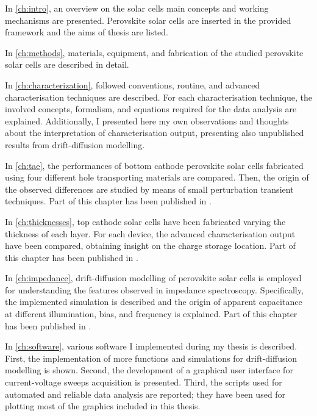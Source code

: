 
\hspace{\parindent}In \cref{ch:intro}, an overview on the solar cells main concepts and working mechanisms are presented.
Perovskite solar cells are inserted in the provided framework and the aims of thesis are listed.

In \cref{ch:methods}, materials, equipment, and fabrication of the studied perovskite solar cells are described in detail.

In \cref{ch:characterization}, followed conventions, routine, and advanced characterisation techniques are described.
For each characterisation technique, the involved concepts, formalism, and equations required for the data analysis are explained.
Additionally, I presented here my own observations and thoughts about the interpretation of characterisation output, presenting also unpublished results from drift\hyp{}diffusion modelling.

In \cref{ch:tae}, the performances of bottom cathode perovskite solar cells fabricated using four different hole transporting materials are compared.
Then, the origin of the observed differences are studied by means of small perturbation transient techniques.
Part of this chapter has been published in \cite{Gelmetti2019}.

In \cref{ch:thicknesses}, top cathode solar cells have been fabricated varying the thickness of each layer.
For each device, the advanced characterisation output have been compared, obtaining insight on the charge storage location.
Part of this chapter has been published in \cite{Gelmetti2017}.

In \cref{ch:impedance}, drift\hyp{}diffusion modelling of perovskite solar cells is employed for understanding the features observed in impedance spectroscopy.
Specifically, the implemented simulation is described and the origin of apparent capacitance at different illumination, bias, and frequency is explained.
Part of this chapter has been published in \cite{Moia2019}.

In \cref{ch:software}, various software I implemented during my thesis is described.
First, the implementation of more functions and simulations for drift\hyp{}diffusion modelling is shown.
Second, the development of a graphical user interface for current\hyp{}voltage sweeps acquisition is presented.
Third, the scripts used for automated and reliable data analysis are reported; they have been used for plotting most of the graphics included in this thesis.

